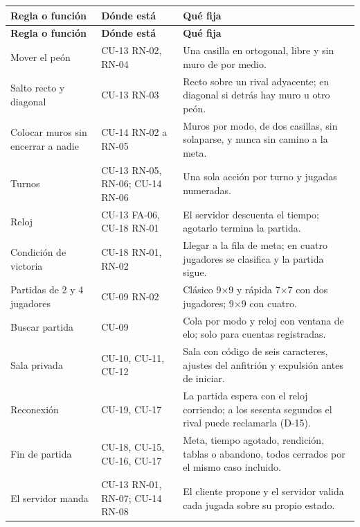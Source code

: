 \begin{center}\small
\begin{longtable}{|L{0.28\textwidth}|L{0.21\textwidth}|L{0.39\textwidth}|}
\hline
\textbf{Regla o función} & \textbf{Dónde está} & \textbf{Qué fija} \\ \hline
\endfirsthead
\hline
\textbf{Regla o función} & \textbf{Dónde está} & \textbf{Qué fija} \\ \hline
\endhead
Mover el peón & \mbox{CU-13} \mbox{RN-02}, \mbox{RN-04} & Una casilla en ortogonal, libre y sin muro de por medio. \\ \hline
Salto recto y diagonal & \mbox{CU-13} \mbox{RN-03} & Recto sobre un rival adyacente; en diagonal si detrás hay muro u otro peón. \\ \hline
Colocar muros sin encerrar a nadie & \mbox{CU-14} \mbox{RN-02} a \mbox{RN-05} & Muros por modo, de dos casillas, sin solaparse, y nunca sin camino a la meta. \\ \hline
Turnos & \mbox{CU-13} \mbox{RN-05}, \mbox{RN-06}; \mbox{CU-14} \mbox{RN-06} & Una sola acción por turno y jugadas numeradas. \\ \hline
Reloj & \mbox{CU-13} \mbox{FA-06}, \mbox{CU-18} \mbox{RN-01} & El servidor descuenta el tiempo; agotarlo termina la partida. \\ \hline
Condición de victoria & \mbox{CU-18} \mbox{RN-01}, \mbox{RN-02} & Llegar a la fila de meta; en cuatro jugadores se clasifica y la partida sigue. \\ \hline
Partidas de 2 y 4 jugadores & \mbox{CU-09} \mbox{RN-02} & Clásico 9×9 y rápida 7×7 con dos jugadores; 9×9 con cuatro. \\ \hline
Buscar partida & \mbox{CU-09} & Cola por modo y reloj con ventana de elo; solo para cuentas registradas. \\ \hline
Sala privada & \mbox{CU-10}, \mbox{CU-11}, \mbox{CU-12} & Sala con código de seis caracteres, ajustes del anfitrión y expulsión antes de iniciar. \\ \hline
Reconexión & \mbox{CU-19}, \mbox{CU-17} & La partida espera con el reloj corriendo; a los sesenta segundos el rival puede reclamarla (\mbox{D-15}). \\ \hline
Fin de partida & \mbox{CU-18}, \mbox{CU-15}, \mbox{CU-16}, \mbox{CU-17} & Meta, tiempo agotado, rendición, tablas o abandono, todos cerrados por el mismo caso incluido. \\ \hline
El servidor manda & \mbox{CU-13} \mbox{RN-01}, \mbox{RN-07}; \mbox{CU-14} \mbox{RN-08} & El cliente propone y el servidor valida cada jugada sobre su propio estado. \\ \hline
\end{longtable}
\end{center}

